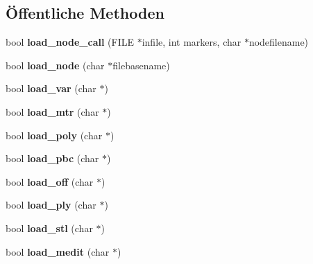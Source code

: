 \subsection*{Öffentliche Methoden}
\begin{DoxyCompactItemize}
\item 
\hypertarget{classtetgenio_ac847433e8c05ee209e0da380fca13c12}{bool {\bfseries load\-\_\-node\-\_\-call} (F\-I\-L\-E $\ast$infile, int markers, char $\ast$nodefilename)}\label{classtetgenio_ac847433e8c05ee209e0da380fca13c12}

\item 
\hypertarget{classtetgenio_a7530e0018500fab6051c5063e24e94d1}{bool {\bfseries load\-\_\-node} (char $\ast$filebasename)}\label{classtetgenio_a7530e0018500fab6051c5063e24e94d1}

\item 
\hypertarget{classtetgenio_a42b38e1e09d889f3027225402d888721}{bool {\bfseries load\-\_\-var} (char $\ast$)}\label{classtetgenio_a42b38e1e09d889f3027225402d888721}

\item 
\hypertarget{classtetgenio_a281d6699f746ac5d2b4ca70075be53c7}{bool {\bfseries load\-\_\-mtr} (char $\ast$)}\label{classtetgenio_a281d6699f746ac5d2b4ca70075be53c7}

\item 
\hypertarget{classtetgenio_a88658f64d725eb11ff33e7104e14561b}{bool {\bfseries load\-\_\-poly} (char $\ast$)}\label{classtetgenio_a88658f64d725eb11ff33e7104e14561b}

\item 
\hypertarget{classtetgenio_a9c3559e0c61df8bb9d4ccff74af39cc0}{bool {\bfseries load\-\_\-pbc} (char $\ast$)}\label{classtetgenio_a9c3559e0c61df8bb9d4ccff74af39cc0}

\item 
\hypertarget{classtetgenio_a71c8e637cb420c3a87b648405df47abd}{bool {\bfseries load\-\_\-off} (char $\ast$)}\label{classtetgenio_a71c8e637cb420c3a87b648405df47abd}

\item 
\hypertarget{classtetgenio_a9b2764289916b479bda5f78b7e6189dc}{bool {\bfseries load\-\_\-ply} (char $\ast$)}\label{classtetgenio_a9b2764289916b479bda5f78b7e6189dc}

\item 
\hypertarget{classtetgenio_a90b035937bf1ff57597f7ba8ecf3d21f}{bool {\bfseries load\-\_\-stl} (char $\ast$)}\label{classtetgenio_a90b035937bf1ff57597f7ba8ecf3d21f}

\item 
\hypertarget{classtetgenio_adf6a237c230f8c79dc376a3911a49a6b}{bool {\bfseries load\-\_\-medit} (char $\ast$)}\label{classtetgenio_adf6a237c230f8c79dc376a3911a49a6b}


\end{DoxyCompactItemize}
